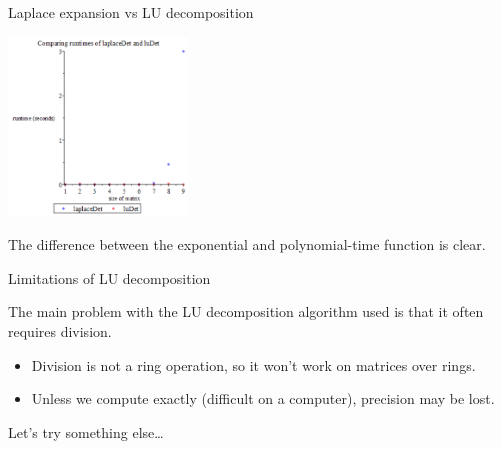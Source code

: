 \documentclass{beamer}
\begin{document}
\begin{frame}{Laplace expansion vs LU decomposition}

    \begin{center}{}
        \includegraphics[height=180]{laplace-lu}
    \end{center}

    The difference between the exponential and polynomial-time function is clear.
\end{frame}


\begin{frame}{Limitations of LU decomposition}

    The main problem with the LU decomposition algorithm used is that it often requires division.

    \begin{itemize}
        \pause{}
    \item Division is not a ring operation, so it won't work on matrices over rings.
        \pause{}
    \item Unless we compute exactly (difficult on a computer), precision may be lost.
\end{itemize}

\pause{}
Let's try something else\dots

\end{frame}
\end{document}
